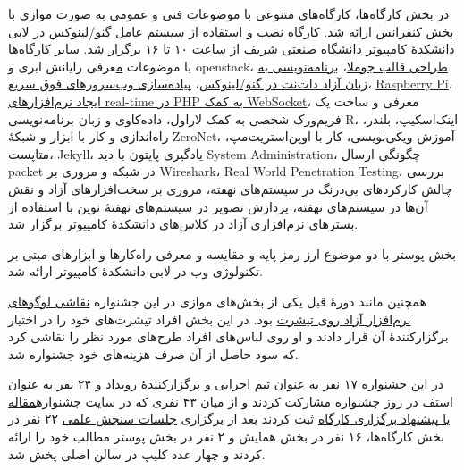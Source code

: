 \documentclass{article}
\begin{document}
{{در بخش کارگاه‌ها، کارگاه‌های متنوعی با موضوعات فنی و عمومی به صورت موازی با بخش کنفرانس ارائه شد. کارگاه نصب و استفاده از سیستم عامل گنو/لینوکس در لابی دانشکدهٔ کامپیوتر دانشگاه صنعتی شریف از ساعت ۱۰ تا ۱۶ برگزار شد. سایر کارگاه‌ها با موضوعات
\href{https://www.youtube.com/watch?v=ZMEfgwD_10I&index=22&list=PLzkZTZKm4j8HDREDT5RXSpHJVmy06pN0D}معرفی رایانش ابری و openstack}، 
\href{https://www.youtube.com/watch?v=8FFL_XI8rHY&index=23&list=PLzkZTZKm4j8HDREDT5RXSpHJVmy06pN0D}{طراحی قالب جوملا}،
\href{https://www.youtube.com/watch?v=PRuvBrRRpOA&list=PLzkZTZKm4j8HDREDT5RXSpHJVmy06pN0D&index=24}{برنامه‌نویسی به زبان آزاد دات‌نت در گنو/لینوکس}، 
\href{https://www.youtube.com/watch?v=oCCg6RKvrkU&list=PLzkZTZKm4j8HDREDT5RXSpHJVmy06pN0D&index=25}{پیاده‌سازی وب‌سرورهای فوق سریع}، 
\href{https://www.youtube.com/watch?v=0o_PPJ1KMcg&index=26&list=PLzkZTZKm4j8HDREDT5RXSpHJVmy06pN0D}{Raspberry Pi}، 
\href{https://www.youtube.com/watch?v=aMxSzbe7fyg&index=26&list=PLzkZTZKm4j8HDREDT5RXSpHJVmy06pN0D}{ایجاد نرم‌افزارهای real-time در PHP به کمک WebSocket}، 
معرفی و ساخت یک فریم‌ورک شخصی به کمک لاراول، داده‌کاوی و زبان برنامه‌نویسی R، اینک‌اسکیپ، بلندر، راه‌اندازی و کار با ابزار و شبکهٔ ZeroNet، آموزش ویکی‌نویسی، کار با اوپن‌استریت‌مپ، متاپست، Jekyll، یادگیری پایتون با دید System Administration، چگونگی ارسال packet در شبکه و مروری بر Wireshark، Real World Penetration Testing، بررسی چالش کارکردهای بی‌درنگ در سیستم‌های نهفته، مروری بر سخت‌افزارهای آزاد و نقش آن‌ها در سیستم‌های نهفته، پردازش تصویر در سیستم‌های نهفتهٔ نوین با استفاده از بسترهای نرم‌افزاری آزاد در کلاس‌های دانشکدهٔ کامپیوتر برگزار شد.

بخش پوستر با دو موضوع ارز رمز پایه و مقایسه و معرفی راه‌کارها و ابزارهای مبتی بر تکنولوژی وب در لابی دانشکدهٔ کامپیوتر ارائه شد.

همچنین مانند دورهٔ قبل یکی از بخش‌های موازی در این جشنواره \href{http://sfd.fsug.ir/1395/paint}{نقاشی لوگوهای نرم‌افزار آزاد روی تیشرت} بود. در این بخش افراد تیشرت‌های خود را در اختیار برگزارکنندهٔ آن قرار دادند و او روی لباس‌های افراد طرح‌های مورد نظر را نقاشی کرد که سود حاصل از آن صرف هزینه‌های خود جشنواره شد.

در این جشنواره ۱۷ نفر به عنوان \href{http://sfd.fsug.ir/1395/patronage/staff}{تیم اجرایی} و برگزارکنندهٔ رویداد و ۲۴ نفر به عنوان\hspace{100pt} استف در روز جشنواره مشارکت کردند و از میان ۴۳ نفری که در سایت جشنواره\newline \href{http://sfd.fsug.ir/1395/plan/articles}{مقاله یا پیشنهاد برگزاری کارگاه} ثبت کردند بعد از برگزاری \href{http://sfd.fsug.ir/1395/referee}{جلسات سنجش علمی} ۲۲ نفر در بخش کارگاه‌ها، ۱۶ نفر در بخش همایش و ۲ نفر در بخش پوستر مطالب خود را ارائه کردند و چهار عدد کلیپ در سالن اصلی پخش شد.

}
\end{document}
